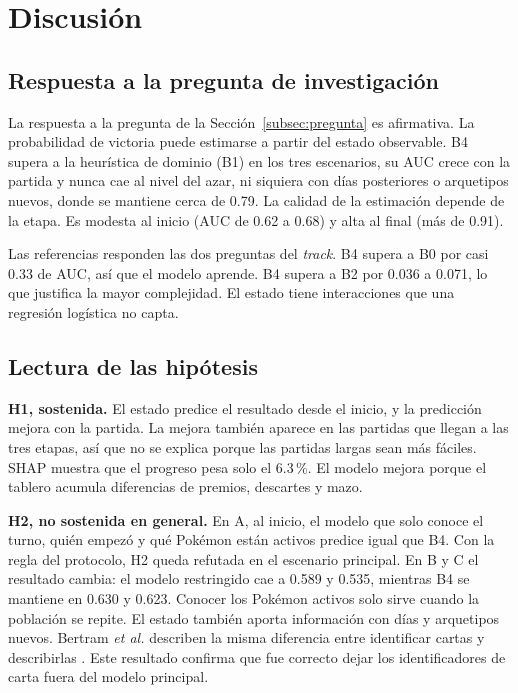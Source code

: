 
\section{Discusión}
\label{sec:discusion}

\subsection{Respuesta a la pregunta de investigación}
\label{subsec:respuestapi}

La respuesta a la pregunta de la Sección~\ref{subsec:pregunta} es
afirmativa. La probabilidad de victoria puede estimarse a partir del
estado observable. B4 supera a la heurística de dominio (B1) en los tres
escenarios, su AUC crece con la partida y nunca cae al nivel del azar, ni
siquiera con días posteriores o arquetipos nuevos, donde se mantiene cerca
de 0.79. La calidad de la estimación depende de la etapa. Es modesta al
inicio (AUC de 0.62 a 0.68) y alta al final (más de 0.91).

Las referencias responden las dos preguntas del \textit{track}. B4 supera a
B0 por casi 0.33 de AUC, así que el modelo aprende. B4 supera a B2 por
0.036 a 0.071, lo que justifica la mayor complejidad. El estado tiene
interacciones que una regresión logística no capta.

\subsection{Lectura de las hipótesis}
\label{subsec:discusionhipotesis}

\noindent\textbf{H1, sostenida.} El estado predice el resultado desde el
inicio, y la predicción mejora con la partida. La mejora también aparece en
las partidas que llegan a las tres etapas, así que no se explica porque las
partidas largas sean más fáciles. SHAP muestra que el progreso pesa solo el
6.3\,\%. El modelo mejora porque el tablero
acumula diferencias de premios, descartes y mazo.

\noindent\textbf{H2, no sostenida en general.} En A, al inicio, el modelo
que solo conoce el turno, quién empezó y qué Pok\'emon están activos
predice igual que B4. Con la regla del protocolo, H2 queda refutada en el
escenario principal. En B y C el resultado cambia: el modelo restringido
cae a 0.589 y 0.535, mientras B4 se mantiene en 0.630 y 0.623. Conocer los
Pok\'emon activos solo sirve cuando la población se repite. El estado
también aporta información con días y arquetipos nuevos. Bertram \textit{et al.}
describen la misma diferencia entre identificar cartas y describirlas
\cite{bertram_cardrepresentations_2024}. Este resultado confirma que fue
correcto dejar los identificadores de carta fuera del modelo principal.

